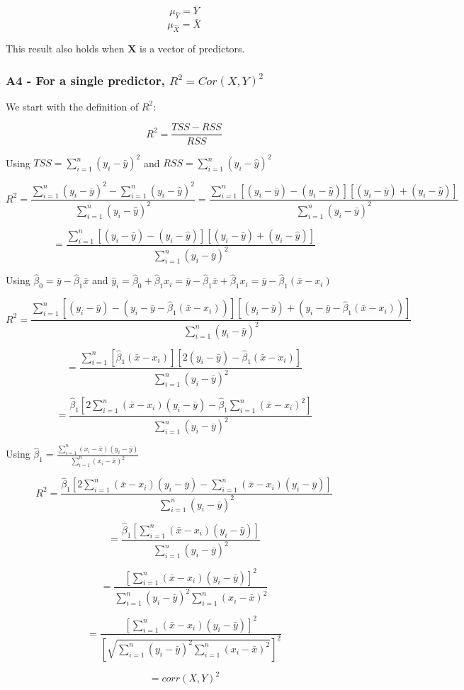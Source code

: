 \documentclass[11pt]{article}
\begin{document}
\[\mu_{\hat{Y}} = \bar{Y}\] \[\mu_{\hat{X}} = \bar{X}\]

This result also holds when \(\boldsymbol{X}\) is a vector of
predictors.

    \subsubsection{\texorpdfstring{A4 - For a single predictor,
\(R^2 = Cor(X,Y)^2\)}{A4 - For a single predictor, R\^{}2 = Cor(X,Y)\^{}2}}\label{a4---for-a-single-predictor-r2-corxy2}

We start with the definition of \(R^2\):

\[R^2 = \frac{ TSS - RSS }{ RSS }\]

Using \(TSS = \sum_{i=1}^n (y_i - \bar{y})^2\) and
\(RSS = \sum_{i=1}^n (y_i - \hat{y})^2\)

\[R^2 = \frac{ \sum_{i=1}^n (y_i - \bar{y})^2 - \sum_{i=1}^n (y_i - \hat{y})^2 }{ \sum_{i=1}^n (y_i - \hat{y})^2 } = \frac{ \sum_{i=1}^n [ (y_i - \bar{y}) - (y_i - \hat{y}) ][ (y_i - \bar{y}) + (y_i - \hat{y}) ] }{ \sum_{i=1}^n (y_i - \bar{y})^2 }\]

\[= \frac{ \sum_{i=1}^n [ (y_i - \bar{y}) - (y_i - \hat{y}) ][ (y_i - \bar{y}) + (y_i - \hat{y}) ] }{ \sum_{i=1}^n (y_i - \bar{y})^2 }\]

Using \(\hat{\beta}_0 = \bar{y} - \hat{\beta}_1 \bar{x}\) and
\(\hat{y}_i = \hat{\beta}_0 + \hat{\beta}_1 x_i = \bar{y} - \hat{\beta}_1 \bar{x} + \hat{\beta}_1 x_i = \bar{y} -\hat{\beta}_1(\bar{x} - x_i)\)

\[R^2= \frac{ \sum_{i=1}^n [ (y_i - \bar{y}) - (y_i - \bar{y} -\hat{\beta}_1(\bar{x} - x_i)) ][ (y_i - \bar{y}) + (y_i - \bar{y} -\hat{\beta}_1(\bar{x} - x_i)) ] }{ \sum_{i=1}^n (y_i - \bar{y})^2 }\]

\[= \frac{ \sum_{i=1}^n [ \hat{\beta}_1(\bar{x} - x_i) ][ 2(y_i - \bar{y}) -\hat{\beta}_1(\bar{x} - x_i) ] }{ \sum_{i=1}^n (y_i - \bar{y})^2 }\]

\[= \frac{ \hat{\beta}_1 \left[ 2 \sum_{i=1}^n (\bar{x} - x_i)(y_i - \bar{y}) - \hat{\beta}_1\sum_{i=1}^n (\bar{x} - x_i)^2 \right] }{ \sum_{i=1}^n (y_i - \bar{y})^2 }\]

Using
\(\hat{\beta}_1 = \frac{ \sum_{i=1}^n (x_i - \bar{x})(y_i - \bar{y}) }{ \sum_{i=1}^n (x_i - \bar{x})^2 }\)

\[R^2 = \frac{ \hat{\beta}_1 \left[ 2 \sum_{i=1}^n (\bar{x} - x_i)(y_i - \bar{y}) - \sum_{i=1}^n (\bar{x} - x_i)(y_i - \bar{y}) \right] }{ \sum_{i=1}^n (y_i - \bar{y})^2 }\]

\[= \frac{ \hat{\beta}_1 \left[ \sum_{i=1}^n (\bar{x} - x_i)(y_i - \bar{y}) \right] }{ \sum_{i=1}^n (y_i - \bar{y})^2 }\]

\[= \frac{ \left[ \sum_{i=1}^n (\bar{x} - x_i)(y_i - \bar{y}) \right]^2 }{ \sum_{i=1}^n (y_i - \bar{y})^2 \sum_{i=1}^n (x_i - \bar{x})^2 }\]

\[= \frac{ \left[ \sum_{i=1}^n (\bar{x} - x_i)(y_i - \bar{y}) \right]^2 }{ \left[ \sqrt{ \sum_{i=1}^n (y_i - \bar{y})^2 \sum_{i=1}^n (x_i - \bar{x})^2} \right]^2}\]

\[= corr(X,Y)^2\]


    
    
    
    
\end{document}
